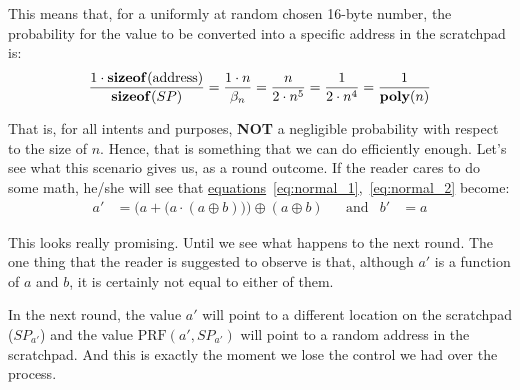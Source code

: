 This means that, for a uniformly at random chosen 16-byte number, the probability for the value to be converted into a specific address in the scratchpad is:
\begin{equation} \nonumber
  \frac{1 \cdot \mbox{\textbf{sizeof}}(\mbox{address})}{\mbox{\textbf{sizeof}}(SP)} =
  \frac{1 \cdot n}{\beta_n} = \frac{n}{2 \cdot n^5} = \frac{1}{2 \cdot n^4} = \frac{1}{\mbox{\textbf{poly}}(n)}
\end{equation}

That is, for all intents and purposes, \textbf{NOT} a negligible probability with respect to the size of $n$. Hence, that is something that we can do efficiently enough. Let's see what this scenario gives us, as a round outcome. If the reader cares to do some math, he/she will see that \hyperref[eq:normal_1]{equations}~\ref{eq:normal_1},~\ref{eq:normal_2} become:
\begin{align} \nonumber
  a' &= \Big( a + \big( a \cdot (a \oplus b) \big) \Big) \oplus (a \oplus b) &
  &\mbox{and} & b' &= a
\end{align}

This looks really promising. Until we see what happens to the next round. The one thing that the reader is suggested to observe is that, although $a'$ is a function of $a$ and $b$, it is certainly not equal to either of them.

In the next round, the value $a'$ will point to a different location on the scratchpad ($SP_{a'}$) and the value $\mbox{PRF}(a', SP_{a'})$ will point to a random address in the scratchpad. And this is exactly the moment we lose the control we had over the process.
